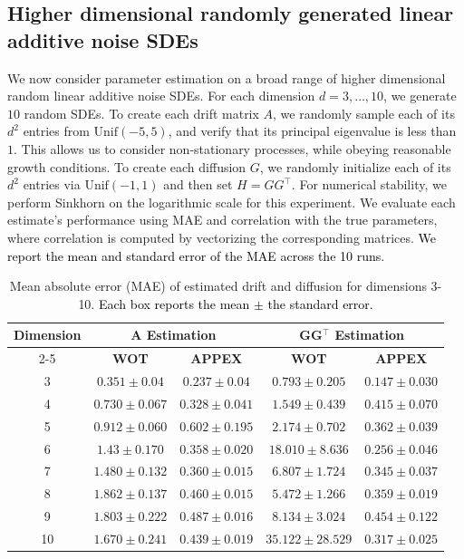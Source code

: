 \documentclass[twoside,11pt]{article}
\newcommand{\rv}[1]{\textcolor{black}{#1}}
\begin{document}
\subsection{Higher dimensional randomly generated linear additive noise SDEs}
\label{sub: higher_dim_exps}
We now consider parameter estimation on a broad range of higher dimensional random linear additive noise SDEs. For each dimension $d=3, \ldots, 10$, we generate $10$ random SDEs. To create each drift matrix $A$, we randomly sample each of its $d^2$ entries from $\text{Unif}(-5,5)$, and verify that its principal eigenvalue is less than $1$. This allows us to consider non-stationary processes, while obeying reasonable growth conditions. To create each diffusion $G$, we randomly initialize each of its $d^2$ entries via $\text{Unif}(-1,1)$ and then set $H=GG^\top$. For numerical stability, we perform Sinkhorn on the logarithmic scale for this experiment. We evaluate each estimate’s performance using MAE and correlation with the true parameters, where correlation is computed by vectorizing the corresponding matrices. \rv{We report the mean and standard error of the MAE across the 10 runs.}


\begin{table}[h!]
  \centering
  \begin{tabular}{|c|c|c|c|c|}
    \hline
    \textbf{Dimension} & \multicolumn{2}{c|}{\textbf{A Estimation}} & \multicolumn{2}{c|}{\textbf{GG$^\top $ Estimation}} \\
    \cline{2-5}
    & \textbf{WOT} & \textbf{APPEX} & \textbf{WOT} & \textbf{APPEX} \\
    \hline
    3 & $0.351 \pm 0.04$ & $\mathbf{0.237 \pm 0.04}$ & $0.793 \pm 0.205$ & $\mathbf{0.147 \pm 0.030}$ \\
    \hline
    4 & $0.730 \pm 0.067$ & $\mathbf{0.328 \pm 0.041}$ & $1.549 \pm 0.439$ & $\mathbf{0.415 \pm 0.070}$ \\
    \hline
    5 & $0.912 \pm 0.060$ & $\mathbf{0.602 \pm 0.195}$ & $2.174 \pm 0.702$ & $\mathbf{0.362 \pm 0.039}$ \\
    \hline
    6 & $1.43 \pm 0.170$ & $\mathbf{0.358 \pm 0.020}$ & $18.010 \pm 8.636$ & $\mathbf{0.256 \pm 0.046}$ \\
    \hline
    7 & $1.480 \pm 0.132$ & $\mathbf{0.360 \pm 0.015}$ & $6.807 \pm 1.724$ & $\mathbf{0.345 \pm 0.037}$\\
    \hline
    8 & $1.862 \pm 0.137$ & $\mathbf{0.460 \pm 0.015}$ & $5.472 \pm 1.266$& $\mathbf{0.359 \pm 0.019}$\\
    \hline
    9 & $1.803 \pm 0.222$ & $\mathbf{0.487 \pm 0.016}$ & $8.134 \pm 3.024$ & $\mathbf{0.454 \pm 0.122}$ \\
    \hline
    10 & $1.670 \pm 0.241$ & $\mathbf{0.439 \pm 0.019}$ & $35.122 \pm 28.529$ & $\mathbf{0.317 \pm 0.025}$ \\
    \hline
  \end{tabular}
  \caption{Mean absolute error (MAE) of estimated drift and diffusion for dimensions 3-10. \rv{Each box reports the mean $\pm$ the standard error.}}
\end{table}
\end{document}
